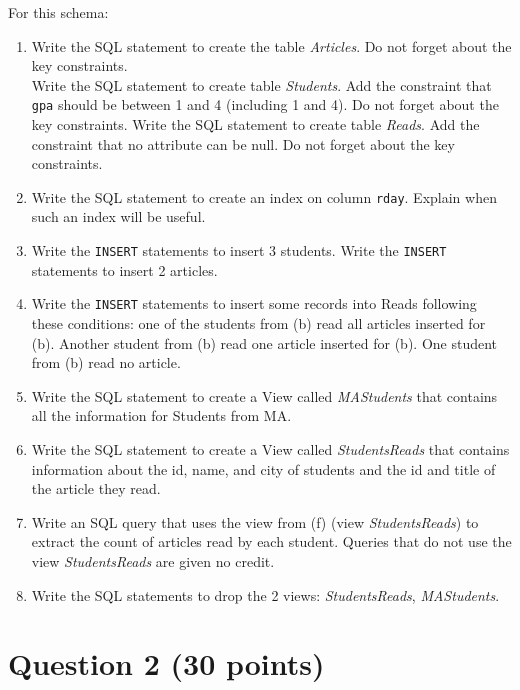 \documentclass[letterpaper, 11pt]{article}
\begin{document}
For this schema:
\begin{enumerate}[label={\alph*}),leftmargin=*]
    \item Write the SQL statement to create the table \textit{Articles}. Do not forget about the key constraints.\\
    Write the SQL statement to create table \textit{Students}. Add the constraint that \texttt{gpa} should be between 1 and 4 (including 1 and 4). Do not forget about the key constraints. Write the SQL statement to create table \textit{Reads}. Add the constraint that no attribute can be null. Do not forget about the key constraints.
    \item Write the SQL statement to create an index on column \texttt{rday}. Explain when such an index will be useful.
    \item Write the \texttt{INSERT} statements to insert 3 students. Write the \texttt{INSERT} statements to insert 2 articles.
    \item Write the \texttt{INSERT} statements to insert some records into Reads following these conditions: one of the students from (b) read all articles inserted for (b). Another student from (b) read one article inserted for (b). One student from (b) read no article. 
    \item Write the SQL statement to create a View called \textit{MAStudents} that contains all the information for Students from MA.
    \item Write the SQL statement to create a View called \textit{StudentsReads} that contains information about the id, name, and city of students and the id and title of the article they read.
    \item Write an SQL query that uses the view from (f) (view \textit{StudentsReads}) to extract the count of articles read by each student. Queries that do not use the view \textit{StudentsReads} are given no credit.
    \item Write the SQL statements to drop the 2 views: \textit{StudentsReads}, \textit{MAStudents}.
\end{enumerate}

\section*{Question 2 (30 points)}
\end{document}
